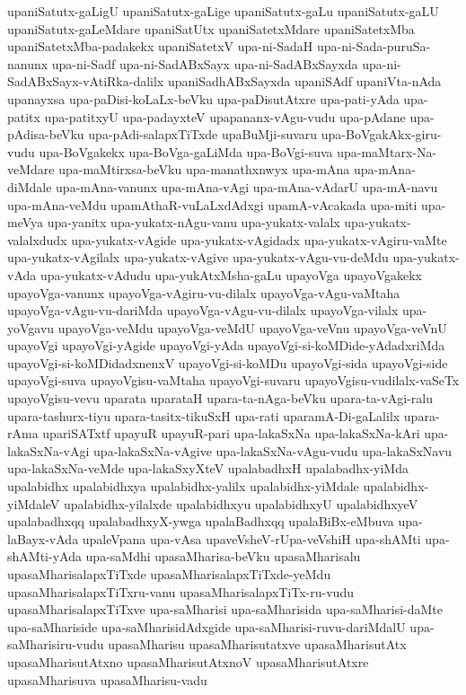 {upaniSatutx-gaLigU
upaniSatutx-gaLige
upaniSatutx-gaLu
upaniSatutx-gaLU
upaniSatutx-gaLeMdare
upaniSatUtx
upaniSatetxMdare
upaniSatetxMba
upaniSatetxMba-padakekx
upaniSatetxV
upa-ni-SadaH
upa-ni-Sada-puruSa-nanunx
upa-ni-Sadf
upa-ni-SadABxSayx
upa-ni-SadABxSayxda
upa-ni-SadABxSayx-vAtiRka-dalilx
upaniSadhABxSayxda
upaniSAdf
upaniVta-nAda
upanayxsa
upa-paDisi-koLaLx-beVku
upa-paDisutAtxre
upa-pati-yAda
upa-patitx
upa-patitxyU
upa-padayxteV
upapananx-vAgu-vudu
upa-pAdane
upa-pAdisa-beVku
upa-pAdi-salapxTiTxde
upaBuMji-suvaru
upa-BoVgakAkx-giru-vudu
upa-BoVgakekx
upa-BoVga-gaLiMda
upa-BoVgi-suva
upa-maMtarx-Na-veMdare
upa-maMtirxsa-beVku
upa-manathxnwyx
upa-mAna
upa-mAna-diMdale
upa-mAna-vanunx
upa-mAna-vAgi
upa-mAna-vAdarU
upa-mA-navu
upa-mAna-veMdu
upamAthaR-vuLaLxdAdxgi
upamA-vAcakada
upa-miti
upa-meVya
upa-yanitx
upa-yukatx-nAgu-vanu
upa-yukatx-valalx
upa-yukatx-valalxdudx
upa-yukatx-vAgide
upa-yukatx-vAgidadx
upa-yukatx-vAgiru-vaMte
upa-yukatx-vAgilalx
upa-yukatx-vAgive
upa-yukatx-vAgu-vu-deMdu
upa-yukatx-vAda
upa-yukatx-vAdudu
upa-yukAtxMsha-gaLu
upayoVga
upayoVgakekx
upayoVga-vanunx
upayoVga-vAgiru-vu-dilalx
upayoVga-vAgu-vaMtaha
upayoVga-vAgu-vu-dariMda
upayoVga-vAgu-vu-dilalx
upayoVga-vilalx
upa-yoVgavu
upayoVga-veMdu
upayoVga-veMdU
upayoVga-veVnu
upayoVga-veVnU
upayoVgi
upayoVgi-yAgide
upayoVgi-yAda
upayoVgi-si-koMDide-yAdadxriMda
upayoVgi-si-koMDidadxnenxV
upayoVgi-si-koMDu
upayoVgi-sida
upayoVgi-side
upayoVgi-suva
upayoVgisu-vaMtaha
upayoVgi-suvaru
upayoVgisu-vudilalx-vaSeTx
upayoVgisu-vevu
uparata
uparataH
upara-ta-nAga-beVku
upara-ta-vAgi-ralu
upara-tashurx-tiyu
upara-tasitx-tikuSxH
upa-rati
uparamA-Di-gaLalilx
upara-rAma
upariSATxtf
upayuR
upayuR-pari
upa-lakaSxNa
upa-lakaSxNa-kAri
upa-lakaSxNa-vAgi
upa-lakaSxNa-vAgive
upa-lakaSxNa-vAgu-vudu
upa-lakaSxNavu
upa-lakaSxNa-veMde
upa-lakaSxyXteV
upalabadhxH
upalabadhx-yiMda
upalabidhx
upalabidhxya
upalabidhx-yalilx
upalabidhx-yiMdale
upalabidhx-yiMdaleV
upalabidhx-yilalxde
upalabidhxyu
upalabidhxyU
upalabidhxyeV
upalabadhxqq
upalabadhxyX-ywga
upalaBadhxqq
upalaBiBx-eMbuva
upa-laBayx-vAda
upaleVpana
upa-vAsa
upaveVsheV-rUpa-veVshiH
upa-shAMti
upa-shAMti-yAda
upa-saMdhi
upasaMharisa-beVku
upasaMharisalu
upasaMharisalapxTiTxde
upasaMharisalapxTiTxde-yeMdu
upasaMharisalapxTiTxru-vanu
upasaMharisalapxTiTx-ru-vudu
upasaMharisalapxTiTxve
upa-saMharisi
upa-saMharisida
upa-saMharisi-daMte
upa-saMhariside
upa-saMharisidAdxgide
upa-saMharisi-ruvu-dariMdalU
upa-saMharisiru-vudu
upasaMharisu
upasaMharisutatxve
upasaMharisutAtx
upasaMharisutAtxno
upasaMharisutAtxnoV
upasaMharisutAtxre
upasaMharisuva
upasaMharisu-vadu
}
